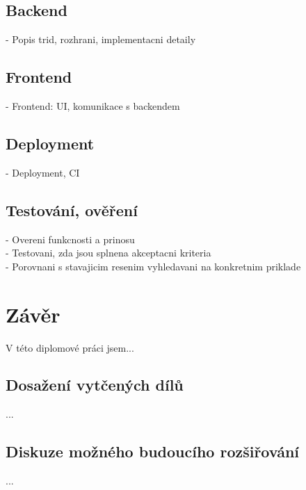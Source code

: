 \documentclass[FM,DP]{tulthesis}
\begin{document}

\section{Backend}
- Popis trid, rozhrani, implementacni detaily

\section{Frontend}
- Frontend: UI, komunikace s backendem

\section{Deployment}
- Deployment, CI

\section{Testování, ověření}
- Overeni funkcnosti a prinosu\\
- Testovani, zda jsou splnena akceptacni kriteria\\
- Porovnani s stavajicim resenim vyhledavani na konkretnim priklade


\chapter{Závěr}
V této diplomové práci jsem...

\section{Dosažení vytčených dílů}
...

\section{Diskuze možného budoucího rozšiřování}
...
\end{document}
